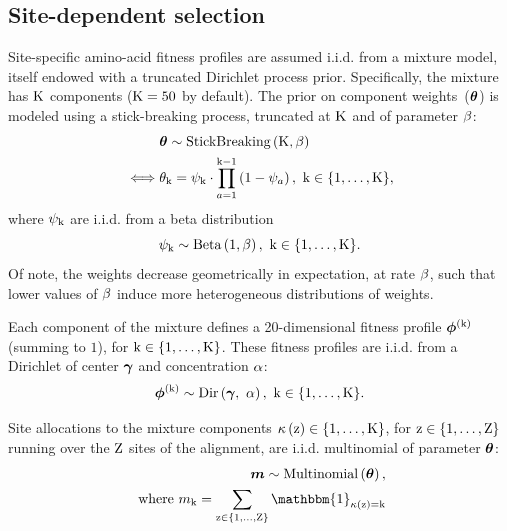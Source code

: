 \documentclass{article}
\begin{document}
\subsection{Site-dependent selection}
\label{sec:profiles}
Site-specific amino-acid fitness profiles are assumed i.i.d. from a mixture model, itself endowed with a truncated Dirichlet process prior.
Specifically, the mixture has $\text{K}$ components ($\text{K} = 50$ by default).
The prior on component weights~($\bm{\theta}$) is modeled using a stick-breaking process, truncated at $\text{K}$ and of parameter $\beta$:
\begin{align}
    \label{eq:DistribStickBreaking}
    \begin{split}
        & \bm{\theta} \sim \text{StickBreaking}\left( \text{K}, \beta \right)\\
        \iff & \theta_{\text{k}} = \psi_{\text{k}}\cdot \prod _{{a=1}}^{{\text{k}-1}}\left(1-\psi_{a}\right),\ \text{k} \in \{1, \hdots, \text{K}\},
    \end{split}
\end{align}
where $\psi_{\text{k}}$ are i.i.d. from a beta distribution
\begin{equation}
    \label{eq:Beta}
    \psi_{\text{k}} \sim \text{Beta}\left( 1, \beta \right),\ \text{k} \in \{1, \hdots, \text{K}\}.
\end{equation}
Of note, the weights decrease geometrically in expectation, at rate $\beta$, such that lower values of $\beta$ induce more heterogeneous distributions of weights.

Each component of the mixture defines a 20-dimensional fitness profile $\bm{\phi}^{(\text{k})}$ (summing to $1$), for $ \text{k} \in \{1, \hdots, \text{K}\}$.
These fitness profiles are i.i.d. from a Dirichlet of center $\bm{\gamma}$ and concentration $\alpha$:
\begin{equation}
    \label{eq:DistribBase}
    \Profile\catexp \sim \text{Dir}\left( \centerProfile,\ \concentrationProfile \right),\ \Setcat.
\end{equation}

Site allocations to the mixture components $\kappa\left(\text{z}\right) \in \{1, \hdots, \text{K}\} $, for $\text{z} \in \{1, \hdots, \text{Z}\}$ running over the $\text{Z}$ sites of the alignment, are i.i.d. multinomial of parameter $\bm{\theta}$:
\begin{align}
    \label{eq:DistribMultinomial}
    \catMultiVar \sim \text{Multinomial}\left( \StickBreaking \right), \\
    \text{ where } \catmultivar_{\cat} = \sum_{\Setsite} \mathbbm{1}_{\catsite = \cat}
\end{align}
\end{document}
